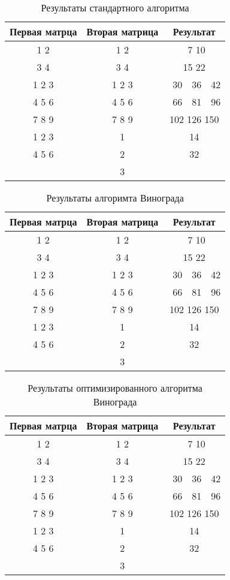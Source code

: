 \begin{table}[H]
    \caption{Результаты стандартного алгоритма}
    \label{table:test-default}
    \centering
    \begin{tabular}{|c|c|c|}
        \hline
        Первая матрца & Вторая матрица & Результат \\
        \hline
        1 2 & 1 2 & \ 7 10 \\
        3 4 & 3 4 & 15 22 \\
        \hline
        1 2 3 & 1 2 3 & \ 30\ \ 36\ \ 42 \\
        4 5 6 & 4 5 6 & \ 66\ \ 81\ \ 96 \\
        7 8 9 & 7 8 9 & 102 126 150 \\
        \hline
        1 2 3 & 1 & 14 \\
        4 5 6 & 2 & 32 \\
              & 3 & \\
        \hline
    \end{tabular}
\end{table}

\begin{table}[H]
    \caption{Результаты алгоримта Винограда}
    \label{table:test-vin}
    \centering
    \begin{tabular}{|c|c|c|}
        \hline
        Первая матрца & Вторая матрица & Результат \\
        \hline
        1 2 & 1 2 & \ 7 10 \\
        3 4 & 3 4 & 15 22 \\
        \hline
        1 2 3 & 1 2 3 & \ 30\ \ 36\ \ 42 \\
        4 5 6 & 4 5 6 & \ 66\ \ 81\ \ 96 \\
        7 8 9 & 7 8 9 & 102 126 150 \\
        \hline
        1 2 3 & 1 & 14 \\
        4 5 6 & 2 & 32 \\
              & 3 & \\
        \hline
    \end{tabular}
\end{table}

\begin{table}[H]
    \caption{Результаты оптимизированного алгоритма Винограда}
    \label{table:test-modvin}
    \centering
    \begin{tabular}{|c|c|c|}
        \hline
        Первая матрца & Вторая матрица & Результат \\
        \hline
        1 2 & 1 2 & \ 7 10 \\
        3 4 & 3 4 & 15 22 \\
        \hline
        1 2 3 & 1 2 3 & \ 30\ \ 36\ \ 42 \\
        4 5 6 & 4 5 6 & \ 66\ \ 81\ \ 96 \\
        7 8 9 & 7 8 9 & 102 126 150 \\
        \hline
        1 2 3 & 1 & 14 \\
        4 5 6 & 2 & 32 \\
              & 3 & \\
        \hline
    \end{tabular}
\end{table}

